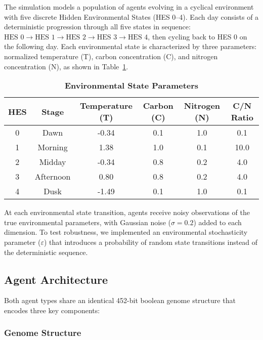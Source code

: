 \documentclass[aps,pre,twocolumn,floatfix,nofootinbib,amsmath,amssymb]{revtex4-2}
\begin{document}
The simulation models a population of agents evolving in a cyclical environment with five discrete Hidden Environmental States (HES 0--4). Each day consists of a deterministic progression through all five states in sequence: $\text{HES } 0 \rightarrow \text{HES } 1 \rightarrow \text{HES } 2 \rightarrow \text{HES } 3 \rightarrow \text{HES } 4$, then cycling back to HES 0 on the following day. Each environmental state is characterized by three parameters: normalized temperature (T), carbon concentration (C), and nitrogen concentration (N), as shown in Table~\ref{tab:environmental_states}.

\begin{table}[H]
\centering
\caption{\textbf{Environmental State Parameters}}
\label{tab:environmental_states}
\begin{tabular}{@{}cccccc@{}}
\toprule
HES & Stage & Temperature (T) & Carbon (C) & Nitrogen (N) & C/N Ratio \\
\midrule
0 & Dawn & -0.34 & 0.1 & 1.0 & 0.1 \\
1 & Morning & 1.38 & 1.0 & 0.1 & 10.0 \\
2 & Midday & -0.34 & 0.8 & 0.2 & 4.0 \\
3 & Afternoon & 0.80 & 0.8 & 0.2 & 4.0 \\
4 & Dusk & -1.49 & 0.1 & 1.0 & 0.1 \\
\bottomrule
\end{tabular}
\end{table}

At each environmental state transition, agents receive noisy observations of the true environmental parameters, with Gaussian noise ($\sigma = 0.2$) added to each dimension. To test robustness, we implemented an environmental stochasticity parameter ($\varepsilon$) that introduces a probability of random state transitions instead of the deterministic sequence.

\subsection{Agent Architecture}

Both agent types share an identical 452-bit boolean genome structure that encodes three key components:

\subsubsection{Genome Structure}
\end{document}
